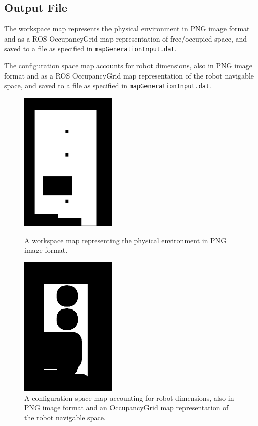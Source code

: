 \documentclass{CSSRforAfrica}
\begin{document}
\subsection*{Output File}
\begin{sloppypar}
The workspace map represents the physical environment in PNG image format and as a ROS OccupancyGrid map representation of free/occupied space, and saved to a file as specified in \texttt{mapGenerationInput.dat}.    
\end{sloppypar}

\begin{sloppypar}
\noindent The configuration space map accounts for robot dimensions, also in PNG image format and as a ROS OccupancyGrid map representation of the robot navigable space, and saved to a file as specified in \texttt{mapGenerationInput.dat}.
\end{sloppypar}


\begin{figure}[H]
  \centering
  \begin{minipage}{0.45\textwidth}
    \centering
    \includegraphics[width=\linewidth,height=6.7cm,keepaspectratio]{images/environmentMap.png}
    \caption{A workspace map representing the physical environment in PNG image format.}
    \label{fig:config_space_map}
  \end{minipage}
  \hfill
  \begin{minipage}{0.45\textwidth}
    \centering
    \includegraphics[width=\linewidth,height=6.7cm,keepaspectratio]{images/navigationMap.png}
    \caption{A configuration space map accounting for robot dimensions, also in PNG image format and an OccupancyGrid map representation of the robot navigable space.}
    \label{fig:waypoint_map}
  \end{minipage}
\end{figure}
\end{document}
